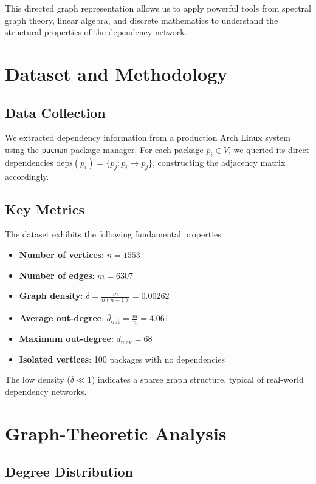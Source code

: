 \documentclass[11pt,a4paper]{article}
\begin{document}
This directed graph representation allows us to apply powerful tools from spectral graph theory, linear algebra, and discrete mathematics to understand the structural properties of the dependency network.

\section{Dataset and Methodology}

\subsection{Data Collection}

We extracted dependency information from a production Arch Linux system using the \texttt{pacman} package manager. For each package $p_i \in V$, we queried its direct dependencies $\text{deps}(p_i) = \{p_j : p_i \rightarrow p_j\}$, constructing the adjacency matrix accordingly.

\subsection{Key Metrics}

The dataset exhibits the following fundamental properties:

\begin{itemize}
\item \textbf{Number of vertices}: $n = 1553$
\item \textbf{Number of edges}: $m = 6307$
\item \textbf{Graph density}: $\delta = \frac{m}{n(n-1)} = 0.00262$
\item \textbf{Average out-degree}: $\bar{d}_{\text{out}} = \frac{m}{n} = 4.061$
\item \textbf{Maximum out-degree}: $d_{\max} = 68$
\item \textbf{Isolated vertices}: 100 packages with no dependencies
\end{itemize}

The low density ($\delta \ll 1$) indicates a sparse graph structure, typical of real-world dependency networks.

\section{Graph-Theoretic Analysis}

\subsection{Degree Distribution}
\end{document}
